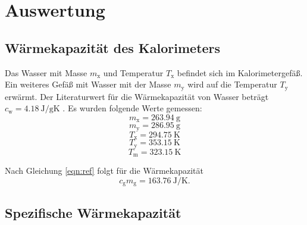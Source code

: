 \section{Auswertung}
\label{sec:Auswertung}
\subsection{Wärmekapazität des Kalorimeters}
Das Wasser mit Masse $m_\text{x}$ und Temperatur $T_\text{x}$ befindet sich im Kalorimetergefäß.
Ein weiteres Gefäß mit Wasser mit der Masse $m_\text{y}$ wird auf die Temperatur $T_\text{y}$ erwärmt.
Der Literaturwert für die Wärmekapazität von Wasser beträgt $c_\text{w} = \SI{4.18}{\joule / \gram\kelvin}$ \cite[159]{anleitung}.
Es wurden folgende Werte gemessen:
\begin{equation*}
    m_\text{x} = \SI{263.94}{\gram}
\end{equation*}
\begin{equation*}
    m_\text{y} = \SI{286.95}{\gram}
\end{equation*}
\begin{equation*}
    T_\text{x} = \SI{294.75}{\kelvin}    
\end{equation*}
\begin{equation*}
    T_\text{y} = \SI{353.15}{\kelvin}
\end{equation*}
\begin{equation*}
    T_\text{m} = \SI{323.15}{\kelvin}
\end{equation*}

Nach Gleichung \eqref{eqn:ref} folgt für die Wärmekapazität
\begin{equation}
    c_\text{g}m_\text{g} = \SI{163.76}{\joule/\kelvin} .
\end{equation}

\subsection{Spezifische Wärmekapazität}
